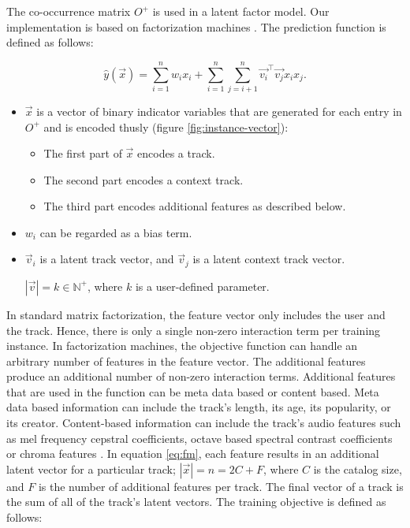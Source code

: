 \documentclass[twocolumn]{article}
\begin{document}
The co-occurrence matrix $O^+$ is used in a latent factor model. Our implementation is based on factorization machines \cite{factorization-machines}. The prediction function is defined as follows:

\begin{equation} \label{eq:fm}
	\hat{y}(\vec{x})= \sum_{i=1}^n w_i x_i +
	\sum_{i=1}^n\sum_{j=i+1}^n \vec{v_i}^\intercal \vec{v_j} x_i x_j.
\end{equation}
\begin{itemize}
  \item $\vec{x}$ is a vector of binary indicator variables that are generated for each entry in $O^+$ and is encoded thusly (figure \ref{fig:instance-vector}): 
  \begin{itemize}
	  \item The first part of $\vec{x}$ encodes a track.
	  \item The second part encodes a context track.
	  \item The third part encodes additional features as described below.
	  \end{itemize}
  \item $w_i$ can be regarded as a bias term.
  \item  $\vec{v}_i$ is a latent track vector, and $\vec{v}_j$ is a latent context track vector. 
   
   $|\vec{v}| = k \in \mathbb{N}^+$, where $k$ is a user-defined parameter.
\end{itemize}
In standard matrix factorization, the feature vector only includes the user and the track. Hence, there is only a single non-zero interaction term per training instance. In factorization machines, the objective function can handle an arbitrary number of features in the feature vector. The additional features produce an additional number of non-zero interaction terms. Additional features that are used in the function can be meta data based or content based. Meta data based information can include the track's length, its age, its popularity, or its creator. Content-based information can include the track's audio features such as mel frequency cepstral coefficients, octave based spectral contrast coefficients or chroma features \cite{content-based}.
In equation \ref{eq:fm}, each feature results in an additional latent vector for a particular track; $|\vec{x}| = n = 2C+F$, where $C$ is the catalog size, and $F$ is the number of additional features per track. The final vector of a track is the sum of all of the track's latent vectors. The training objective is defined as follows:
\end{document}
